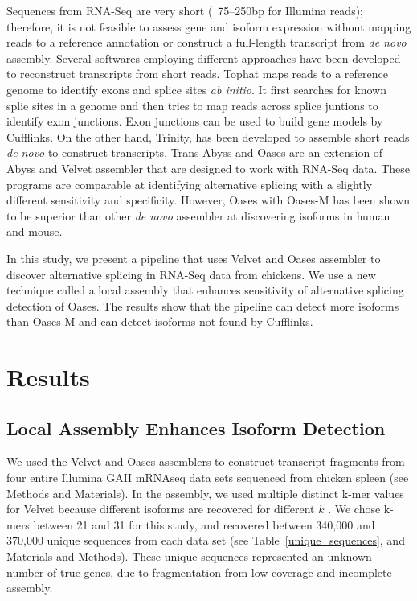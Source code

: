 \documentclass[10pt]{article}
\begin{document}
Sequences from RNA-Seq are very short (~75--250bp for Illumina reads); therefore, it is not feasible to assess gene
and isoform expression without mapping reads to a reference annotation or construct a full-length transcript from
\emph{de novo} assembly.
Several softwares employing different approaches have been developed to reconstruct transcripts from short reads.
Tophat\cite{Trapnell:2009dp} maps reads to a reference genome to identify exons and splice sites \emph{ab initio}.
It first searches for known splie sites in a genome and then tries to map reads across splice juntions to identify exon junctions.
Exon junctions can be used to build gene models by Cufflinks\cite{Trapnell:2010kd}.
On the other hand, Trinity\cite{Grabherr:2011jb}, has been developed to assemble short reads \emph{de novo} to construct transcripts.
Trans-Abyss\cite{Robertson:2010ih} and Oases\cite{Schulz:2012je} are an extension of Abyss\cite{Simpson:2009iv} and Velvet\cite{Zerbino:2008vu,Zerbino:2009jp} assembler that are designed to work with RNA-Seq data.
These programs are comparable at identifying alternative splicing with a slightly different sensitivity and specificity.
However, Oases with Oases-M has been shown to be superior than other \emph{de novo} assembler at discovering isoforms in human and mouse\cite{Schulz:2012je}.

In this study, we present a pipeline that uses Velvet and Oases assembler to discover alternative splicing in RNA-Seq data from chickens.
We use a new technique called a local assembly that enhances sensitivity of alternative splicing detection of Oases.
The results show that the pipeline can detect more isoforms than Oases-M and can detect isoforms not found by
Cufflinks.

\section*{Results}

\subsection*{Local Assembly Enhances Isoform Detection}

We used the Velvet\cite{Zerbino:2008vu} and Oases\cite{Schulz:2012je}
assemblers to construct transcript fragments from four entire Illumina
GAII mRNAseq data sets sequenced from chicken spleen (see Methods and
Materials).  In the assembly, we used multiple distinct k-mer values
for Velvet because different isoforms are recovered for different $k$
\cite{Schulz:2012je}.  We chose k-mers between 21 and 31 for this
study, and recovered between 340,000 and 370,000 unique sequences from
each data set (see Table~\ref{unique_sequences}, and Materials and
Methods).  These unique sequences represented an unknown number of
true genes, due to fragmentation from low coverage and incomplete
assembly.
\end{document}
